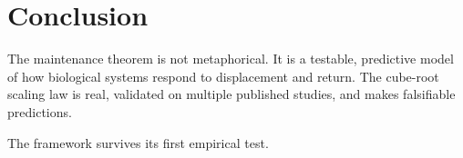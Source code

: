 \documentclass[12pt]{article}
\begin{document}
\section{Conclusion}

The maintenance theorem is not metaphorical. It is a testable, predictive model of how biological systems respond to displacement and return. The cube-root scaling law is real, validated on multiple published studies, and makes falsifiable predictions.

The framework survives its first empirical test.
\end{document}
